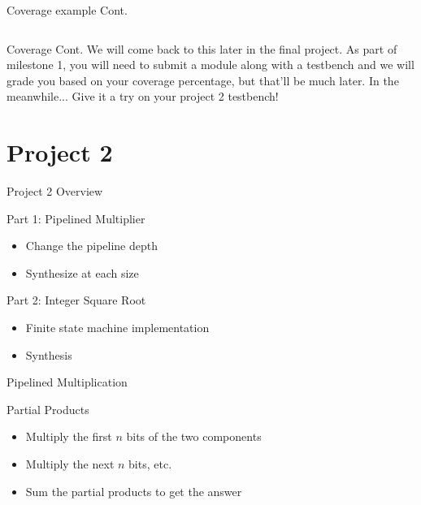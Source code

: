 \documentclass[dvipsnames]{beamer}
\begin{document}
\begin{frame}{Coverage example Cont.}
	\inputminted[frame=lines,fontsize=\scriptsize,tabsize=4,obeytabs=true]{text}{hierarchy.txt}
\end{frame}

\begin{frame}{Coverage Cont.}
    We will come back to this later in the final project.
    As part of milestone 1, you will need to submit a module along with a testbench and we will grade you based on your coverage percentage, but that'll be much later.
    In the meanwhile... Give it a try on your project 2 testbench!
\end{frame}

\section{Project 2}
\begin{frame}{Project 2 Overview}
	\begin{block}{Part 1: Pipelined Multiplier}
		\begin{itemize}
			\item Change the pipeline depth
			\item Synthesize at each size
		\end{itemize}
	\end{block}
	\begin{block}{Part 2: Integer Square Root}
		\begin{itemize}
			\item Finite state machine implementation
			\item Synthesis
		\end{itemize}
	\end{block}
\end{frame}

\begin{frame}{Pipelined Multiplication}
	\begin{block}{Partial Products}
		\begin{itemize}
			\item Multiply the first $n$ bits of the two components
			\item Multiply the next $n$ bits, etc.
			\item Sum the partial products to get the answer
		\end{itemize}
	\end{block}
\end{frame}
\end{document}
